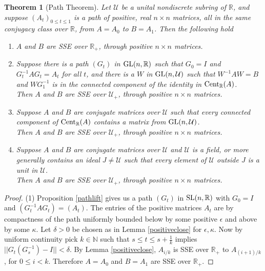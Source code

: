 \documentclass{amsart}
\newtheorem{theorem}{Theorem}[section]
\theoremstyle{definition}
\theoremstyle{remark}
\numberwithin{equation}{section}
\begin{document}
{{\begin{theorem}[Path Theorem] \label{paththeorem} 
Let $\mathcal U$ be a unital nondiscrete subring of $\mathbb R$, and  
suppose $(A_t)_{0\leq t\leq 1} $ is a path of positive, real 
$n\times n$ matrices, 
all in the same conjugacy class over $\mathbb R$,  
from $A=A_0$ to $ B=A_1$. Then the following hold 
\begin{enumerate} 
\item 
$A$ and $B$ are SSE over $\mathbb R_+$, through positive 
$n\times n$ matrices.  
\item 
Suppose there is a path $(G_t)$ in $\textnormal{GL}(n,\mathbb R)$ 
such that $G_0=I$ and 
$G_t^{-1}AG_t=A_t$ for all $t$, and 
   there is a $W$ in $\textnormal{GL}(n, \mathcal U)$ such that 
$W^{-1}AW=B$ and $WG_1^{-1}$ is in the connected component 
of the identity in $\textnormal{Cent}_{\mathbb R}(A)$.  \\ 
Then $A$ and $B$ are SSE over  $\mathcal U_+$, 
 through positive $n\times n$ matrices.  
\item 
Suppose $A$ and $B$ are conjugate matrices over $\mathcal U$ such that every 
connected component of 
$\textnormal{Cent}_{\mathbb R} (A) $ contains a matrix from 
$\textnormal{GL}(n, \mathcal U)$.\\ 
Then 
 $A$ and $B$ are SSE over $\mathcal U_+$,  through positive 
 $n\times n$  matrices.  
\item
Suppose $A$ and $B$ are conjugate matrices over $\mathcal U$ and 
$\mathcal U$ is a field, or more generally 
contains an ideal $J\neq \mathcal U$ 
such that every  element of $\mathcal U$ outside $J$ is a 
unit in $\mathcal U$. \\
Then 
 $A$ and $B$ are SSE over $\mathcal U_+$,  through positive 
 $n\times n$  matrices.  
\end{enumerate} 
\end{theorem} 

\begin{proof}
(1) Proposition \ref{pathlift} gives us a 
 path $(G_t)$ in $\textnormal{SL}(n,\mathbb R)$ with $G_0=I$ and 
$(G_t^{-1}AG_t)=(A_t)$. 
The entries of the positive matrices 
$A_t$ are by compactness of the path uniformly bounded below  by some 
positive  $\epsilon $ and above by some $\kappa$. 
Let $\delta > 0$ be chosen as in 
Lemma \ref{positiveclose} for $\epsilon, \kappa$. 
Now by uniform continuity pick $k\in \mathbb N$ such that 
$ s\leq t\leq s+\frac 1k$ implies 
$||G_t(G_s^{-1})-I||<\delta$. 
By Lemma \ref{positiveclose}, $A_{i/k}$ is SSE over $\mathbb R_+$ to 
$A_{(i+1)/k}$, for $0\leq i < k$. Therefore $A=A_0$ and $B=A_1$ are SSE 
over $\mathbb R_+$. 


\end{proof}}}
\end{document}
